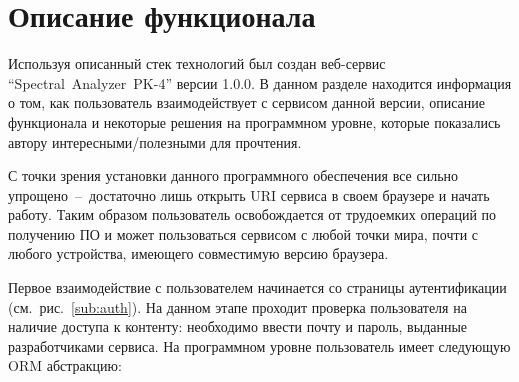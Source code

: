 \section{Описание функционала}
Используя описанный стек технологий был создан веб-сервис “Spectral~Analyzer~PK-4” версии 1.0.0.
В данном разделе находится информация о том, как пользователь взаимодействует с сервисом данной версии, описание функционала
и некоторые решения на программном уровне, которые показались автору интересными/полезными для прочтения.

С точки зрения установки данного программного обеспечения все сильно упрощено~--~достаточно лишь открыть URI
сервиса в своем браузере и начать работу. Таким образом пользователь освобождается от трудоемких операций по получению ПО
и может пользоваться сервисом с любой точки мира, почти с любого устройства, имеющего совместимую версию браузера.

Первое взаимодействие с пользователем начинается со страницы аутентификации (см.~рис.~\ref{sub:auth}). На данном
этапе проходит проверка пользователя на наличие доступа к контенту: необходимо ввести почту и пароль, выданные разработчиками
сервиса. На программном уровне пользователь имеет следующую ORM абстракцию:

